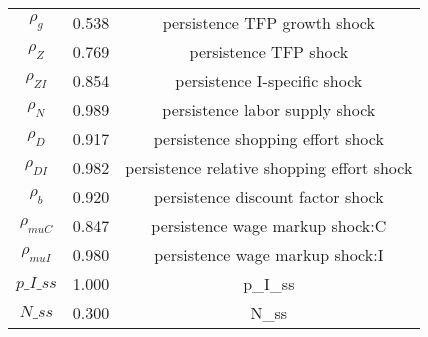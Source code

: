 \begin{center}
\begin{longtable}{ccc}
${\rho_g}$ 	 & 	 0.538 	 & 	 persistence TFP growth shock\\
${\rho_Z}$ 	 & 	 0.769 	 & 	 persistence TFP shock\\
${\rho_{ZI}}$ 	 & 	 0.854 	 & 	 persistence I-specific shock\\
${\rho_N}$ 	 & 	 0.989 	 & 	 persistence labor supply shock\\
${\rho_D}$ 	 & 	 0.917 	 & 	 persistence shopping effort shock\\
${\rho_{DI}}$ 	 & 	 0.982 	 & 	 persistence relative shopping effort shock\\
${\rho_b}$ 	 & 	 0.920 	 & 	 persistence discount factor shock\\
${\rho_{muC}}$ 	 & 	 0.847 	 & 	 persistence wage markup shock:C\\
${\rho_{muI}}$ 	 & 	 0.980 	 & 	 persistence wage markup shock:I\\
$p\_I\_ss$ 	 & 	 1.000 	 & 	 p\_I\_ss\\
$N\_ss$ 	 & 	 0.300 	 & 	 N\_ss\\
\bottomrule%
\end{longtable}
\end{center}
